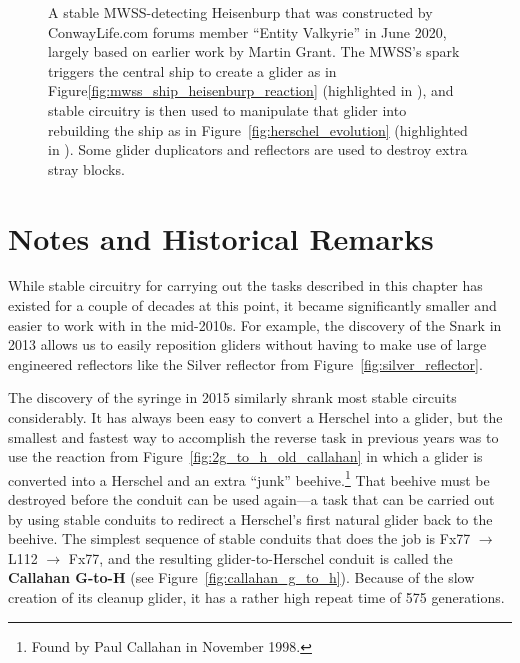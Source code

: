 \begin{figure}[!htb]
	\centering
	\caption{A stable MWSS-detecting Heisenburp that was constructed by ConwayLife.com forums member ``Entity Valkyrie'' in June 2020, largely based on earlier work by Martin Grant. The MWSS's spark triggers the central ship to create a glider as in Figure\ref{fig:mwss_ship_heisenburp_reaction} (highlighted in ), and stable circuitry is then used to manipulate that glider into rebuilding the ship as in Figure~\ref{fig:herschel_evolution} (highlighted in ). Some glider duplicators and reflectors are used to destroy extra stray blocks.}\label{fig:stable_heisenburp}
\end{figure}


\section{Notes and Historical Remarks}\label{sec:stable_circuits_notes}

While stable circuitry for carrying out the tasks described in this chapter has existed for a couple of decades at this point, it became significantly smaller and easier to work with in the mid-2010s. For example, the discovery of the Snark in 2013 allows us to easily reposition gliders without having to make use of large engineered reflectors like the Silver reflector from Figure~\ref{fig:silver_reflector}.

The discovery of the syringe in 2015 similarly shrank most stable circuits considerably. It has always been easy to convert a Herschel into a glider, but the smallest and fastest way to accomplish the reverse task in previous years was to use the reaction from Figure~\ref{fig:2g_to_h_old_callahan} in which a glider is converted into a Herschel and an extra ``junk'' beehive.\footnote{Found by Paul Callahan in November 1998.} That beehive must be destroyed before the conduit can be used again---a task that can be carried out by using stable conduits to redirect a Herschel's first natural glider back to the beehive. The simplest sequence of stable conduits that does the job is Fx77 $\rightarrow$ L112 $\rightarrow$ Fx77, and the resulting glider-to-Herschel conduit is called the \textbf{Callahan G-to-H} (see Figure~\ref{fig:callahan_g_to_h}). Because of the slow creation of its cleanup glider, it has a rather high repeat time of 575 generations.

